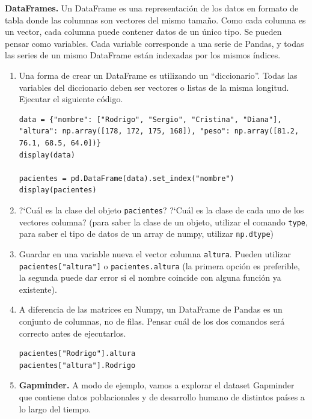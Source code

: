 \documentclass[a4paper,11pt]{article}
\theoremstyle{definition}
\begin{document}
\textbf{DataFrames.} Un DataFrame es una representaci\'on de los datos en formato de tabla donde las columnas son vectores del mismo tama\~no. Como cada columna es un vector, cada columna puede contener datos de un \'unico tipo. Se pueden pensar como variables. Cada variable corresponde a una serie de Pandas, y todas las series de un mismo DataFrame están indexadas por los mismos índices.

\begin{enumerate}[resume]
\item Una forma de crear un DataFrame es utilizando un ``diccionario''. Todas las variables del diccionario deben ser vectores o listas de la misma longitud. Ejecutar el siguiente c\'odigo.

\begin{lstlisting}
data = {"nombre": ["Rodrigo", "Sergio", "Cristina", "Diana"], "altura": np.array([178, 172, 175, 168]), "peso": np.array([81.2, 76.1, 68.5, 64.0])}
display(data)

pacientes = pd.DataFrame(data).set_index("nombre")
display(pacientes)
\end{lstlisting}

\item ?`Cuál es la clase del objeto \lstinline{pacientes}? ?`Cuál es la clase de cada uno de los vectores columna? (para saber la clase de un objeto, utilizar el comando \lstinline{type}, para saber el tipo de datos de un array de numpy, utilizar \lstinline{np.dtype})

\item Guardar en una variable nueva el vector columna \lstinline{altura}. Pueden utilizar \lstinline{pacientes["altura"]} o \lstinline{pacientes.altura} (la primera opci\'on es preferible, la segunda puede dar error si el nombre coincide con alguna funci\'on ya existente).

\item A diferencia de las matrices en Numpy, un DataFrame de Pandas es un conjunto de columnas, no de filas. Pensar cu\'al de los dos comandos ser\'a correcto antes de ejecutarlos.
\begin{lstlisting}
pacientes["Rodrigo"].altura
pacientes["altura"].Rodrigo
\end{lstlisting}
    
    
\item \textbf{Gapminder.} A modo de ejemplo, vamos a explorar el dataset Gapminder que contiene datos poblacionales y de desarrollo humano de distintos países a lo largo del tiempo.
    

\end{enumerate}
\end{document}
